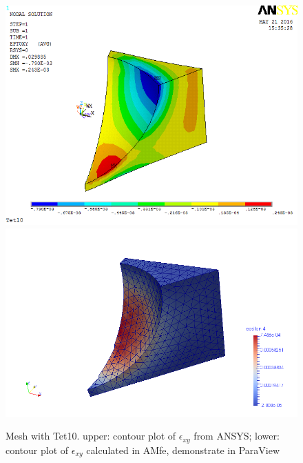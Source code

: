 \begin{figure}[htbp]
	\begin{center}
		\includegraphics[width=13cm,clip]{Tet10_Exy.png} 		
		\includegraphics[width=13cm,clip]{Tet10_Exy_P.png} 		
		\caption{Mesh with Tet10. upper: contour plot of $\epsilon_{xy}$ from ANSYS; lower: contour plot of $\epsilon_{xy}$ calculated in AMfe, demonstrate in ParaView} \label{fig: Tet10_Exy}
	\end{center}
\end{figure}

